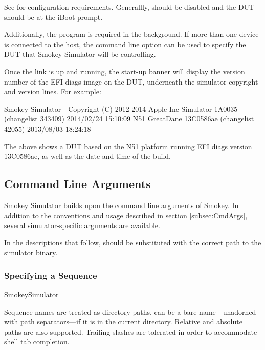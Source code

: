 See  for configuration requirements.  Generallly,
 should be disabled and the DUT should be at the iBoot prompt.

Additionally, the  program is required in the background.  If
more than one device is connected to the host, the command line option
 can be used to specify the DUT that Smokey Simulator will
be controlling.

Once the link is up and running, the start-up banner will display the version
number of the EFI diags image on the DUT, underneath the simulator copyright
and version lines.  For example:

\begin{TerminalOutput}
Smokey Simulator - Copyright (C) 2012-2014 Apple Inc
Simulator 1A0035 (changelist 343409) 2014/02/24 15:10:09
N51 GreatDane 13C0586ae (changelist 42055) 2013/08/03 18:24:18
\end{TerminalOutput}

The above shows a DUT based on the N51 platform running EFI diags version
13C0586ae, as well as the date and time of the build.

\subsection{Command Line Arguments}
\label{subsec:SimCmdArgs}

Smokey Simulator builds upon the command line arguments of Smokey.  In addition
to the conventions and usage described in section \ref{subsec:CmdArgs}, several
simulator-specific arguments are available.

In the descriptions that follow,  should be
substituted with the correct path to the simulator binary.

\subsubsection{Specifying a Sequence}

\begin{CommandLine}
SmokeySimulator ~~
\end{CommandLine}

Sequence names are treated as directory paths.   can be a bare
name---unadorned with path separators---if it is in the current directory.
Relative and absolute paths are also supported.  Trailing slashes are tolerated
in order to accommodate shell tab completion.

